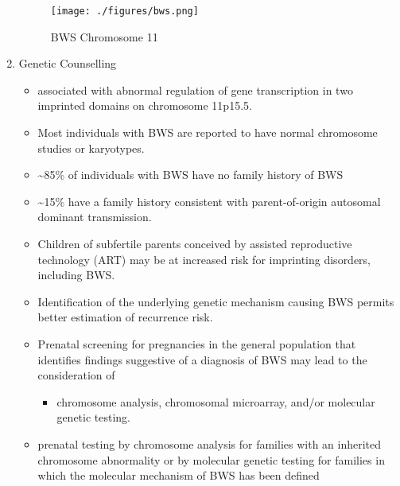 \documentclass[12pt]{scrartcl}
\begin{document}
\begin{enumerate}
\begin{figure}[htbp]
\centering
\texttt{[image: ./figures/bws.png]}
\caption{\label{fig:org994667d}BWS Chromosome 11}
\end{figure}

\item Genetic Counselling
\label{sec:orgcb0676a}
\begin{itemize}
\item associated with abnormal regulation of gene transcription in two
imprinted domains on chromosome 11p15.5.
\item Most individuals with BWS are reported to have normal chromosome
studies or karyotypes.
\item \textasciitilde{}85\% of individuals with BWS have no family history of BWS
\item \textasciitilde{}15\% have a family history consistent with parent-of-origin
autosomal dominant transmission.
\item Children of subfertile parents conceived by assisted reproductive
technology (ART) may be at increased risk for imprinting disorders,
including BWS.
\item Identification of the underlying genetic mechanism causing BWS
permits better estimation of recurrence risk.
\item Prenatal screening for pregnancies in the general population that
identifies findings suggestive of a diagnosis of BWS may lead to the
consideration of
\begin{itemize}
\item chromosome analysis, chromosomal microarray, and/or molecular genetic testing.
\end{itemize}
\item prenatal testing by chromosome analysis for families with an
inherited chromosome abnormality or by molecular genetic testing for
families in which the molecular mechanism of BWS has been defined
\end{itemize}
\end{enumerate}
\end{document}
